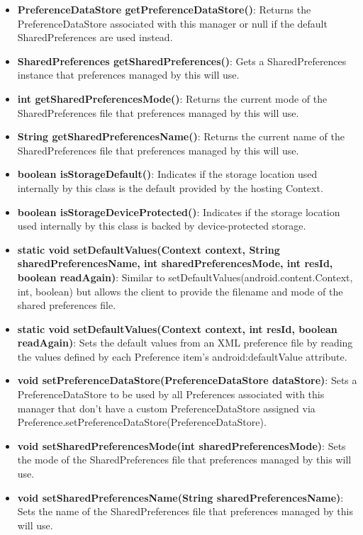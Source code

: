 \documentclass{report}
\begin{document}
\begin{itemize}
\begin{itemize}
                \item \textbf{PreferenceDataStore	getPreferenceDataStore()}: Returns the PreferenceDataStore associated with this manager or null if the default SharedPreferences are used instead.
                \item \textbf{SharedPreferences	getSharedPreferences()}: Gets a SharedPreferences instance that preferences managed by this will use.
                \item \textbf{int	getSharedPreferencesMode()}: Returns the current mode of the SharedPreferences file that preferences managed by this will use.
                \item \textbf{String	getSharedPreferencesName()}: Returns the current name of the SharedPreferences file that preferences managed by this will use.
                \item \textbf{boolean	isStorageDefault()}: Indicates if the storage location used internally by this class is the default provided by the hosting Context.
                \item \textbf{boolean	isStorageDeviceProtected()}: Indicates if the storage location used internally by this class is backed by device-protected storage.
                \item \textbf{static void	setDefaultValues(Context context, String sharedPreferencesName, int sharedPreferencesMode, int resId, boolean readAgain)}: Similar to setDefaultValues(android.content.Context, int, boolean) but allows the client to provide the filename and mode of the shared preferences file.
                \item \textbf{static void	setDefaultValues(Context context, int resId, boolean readAgain)}: Sets the default values from an XML preference file by reading the values defined by each Preference item's android:defaultValue attribute.
                \item \textbf{void	setPreferenceDataStore(PreferenceDataStore dataStore)}: Sets a PreferenceDataStore to be used by all Preferences associated with this manager that don't have a custom PreferenceDataStore assigned via Preference.setPreferenceDataStore(PreferenceDataStore).
                \item \textbf{void	setSharedPreferencesMode(int sharedPreferencesMode)}: Sets the mode of the SharedPreferences file that preferences managed by this will use.
                \item \textbf{void	setSharedPreferencesName(String sharedPreferencesName)}: Sets the name of the SharedPreferences file that preferences managed by this will use.

\end{itemize}
\end{itemize}
\end{document}
